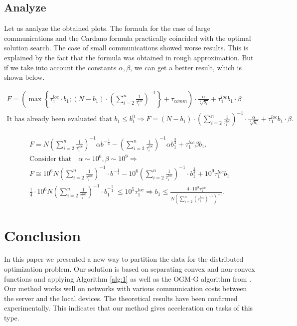 \documentclass{article}
\begin{document}
\subsection{Analyze}
Let us analyze the obtained plots. The formula for the case of large communications and the Cardano formula practically coincided with the optimal solution search. The case of small communications showed worse results. This is explained by the fact that the formula was obtained in rough approximation. But if we take into account the constants $\alpha, \beta$, we can get a better result, which is shown below.



\begin{gather*}
    F=\left(\max \left\{\tau_1^{loc} \cdot b_1 ;\left(N-b_1\right) \cdot\left(\sum_{i=2}^n \frac{1}{\tau_i^{loc}}\right)^{-1}\right\}+\tau_{comm}\right) \cdot \frac{\alpha}{\sqrt[4]{b_1}}+\tau_1^{loc} b_1 \cdot \beta \\
    \text {It has already been evaluated that } b_1 \leq b_1^0 \Rightarrow F=\left(N-b_1\right)\cdot \left(\sum_{i=2}^n \frac{1}{\tau_i^{loc}}\right)^{-1} \cdot \frac{\alpha}{\sqrt[4]{b_1}}+\tau_1^{loc} b_1 \cdot \beta.
\end{gather*}


\begin{gather*}
    F=N\left(\sum_{i=2}^n \frac{1}{\tau_i^{loc}}\right)^{-1} \alpha b^{-\frac{1}{4}}-\left(\sum_{i=2}^n \frac{1}{\tau_i^{loc}}\right)^{-1} \alpha b_1^{\frac{3}{4}}+\tau_1^{l o c} \beta b_1. \\
    \text {Consider that} \quad \alpha \sim 10^6, \beta \sim 10^9 \Rightarrow \\ 
    F \cong 10^6 N \left(\sum_{i=2}^n \frac{1}{\tau_i^{loc}}\right)^{-1} \cdot b^{-\frac{1}{4}}-10^6 \left(\sum_{i=2}^n \frac{1}{\tau_i^{loc}}\right)^{-1} \cdot b_1^{\frac{3}{4}}+10^9 \tau_1^{loc} b_1 \\
    \frac{1}{4} \cdot 10^6 N \left(\sum_{i=2}^n \frac{1}{\tau_i^{loc}}\right)^{-1} \cdot b_1^{-\frac{5}{4}} \ \leq 10^5 \tau_1^{loc} \Rightarrow b_1 \leq \frac{4 \cdot 10^3 \tau_1^{loc}}{N\left(\sum_{i=2}^n\left(\tau_i^{loc}\right)^{-1}\right)^{-1}}.
\end{gather*}

\section{Conclusion}

In this paper we presented a new way to partition the data for the distributed optimization problem. Our solution is based on separating convex and non-convex functions and applying Algorithm \ref{alg:1} as well as the OGM-G algorithm from \citep{kim2021optimizing}. Our method works well on networks with various communication costs between the server and the local devices. The theoretical results have been confirmed experimentally. This indicates that our method gives acceleration on tasks of this type.


  
\end{document}
